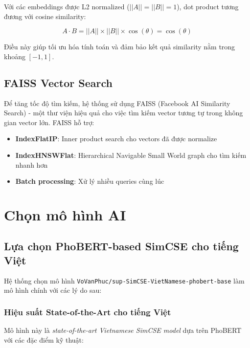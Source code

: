 Với các embeddings được L2 normalized ($||A|| = ||B|| = 1$), dot product tương đương với cosine similarity:

\begin{equation}
A \cdot B = ||A|| \times ||B|| \times \cos(\theta) = \cos(\theta)
\end{equation}

Điều này giúp tối ưu hóa tính toán và đảm bảo kết quả similarity nằm trong khoảng $[-1, 1]$.

\subsection{FAISS Vector Search}

Để tăng tốc độ tìm kiếm, hệ thống sử dụng FAISS (Facebook AI Similarity Search) - một thư viện hiệu quả cho việc tìm kiếm vector tương tự trong không gian vector lớn. FAISS hỗ trợ:

\begin{itemize}
    \item \textbf{IndexFlatIP}: Inner product search cho vectors đã được normalize
    \item \textbf{IndexHNSWFlat}: Hierarchical Navigable Small World graph cho tìm kiếm nhanh hơn
    \item \textbf{Batch processing}: Xử lý nhiều queries cùng lúc
\end{itemize}

\section{Chọn mô hình AI}

\subsection{Lựa chọn PhoBERT-based SimCSE cho tiếng Việt}

Hệ thống chọn mô hình \texttt{VoVanPhuc/sup-SimCSE-VietNamese-phobert-base} làm mô hình chính với các lý do sau:

\subsubsection{Hiệu suất State-of-the-Art cho tiếng Việt}

Mô hình này là \textit{state-of-the-art Vietnamese SimCSE model} dựa trên PhoBERT với các đặc điểm kỹ thuật:

